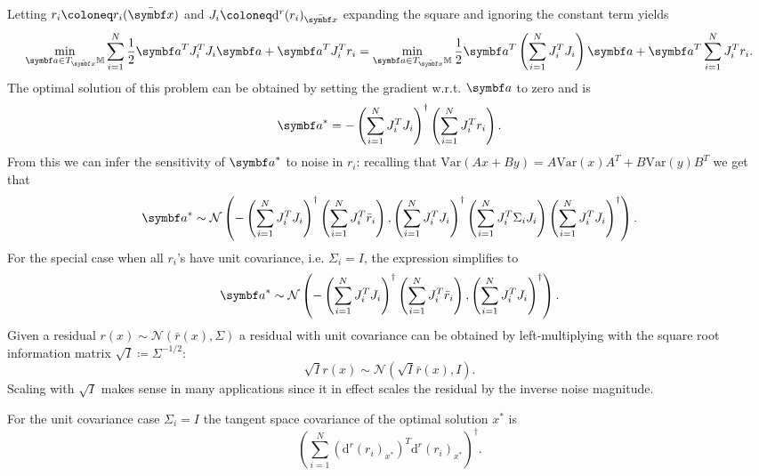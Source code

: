 Letting $r_{i} \coloneq r_{i}(\bar \x)$ and $J_{i} \coloneq \mathrm{d}^{r} (r_{i})_{\bar \x}$ expanding the square and ignoring the constant term yields
\begin{equation}
  \min_{\a \in T_{\bar \x} \M} \sum_{i=1}^{N}\frac{1}{2} \a^{T} J_{i}^{T} J_{i} \a + \a^{T} J_{i}^{T} r_{i} = \min_{\a \in T_{\bar \x} \M} \frac{1}{2} \a^{T} \left( \sum_{i=1}^{N} J_{i}^{T} J_{i} \right) \a + \a^{T} \sum_{i=1}^{N} J_{i}^{T} r_{i}.
\end{equation}
The optimal solution of this problem can be obtained by setting the gradient w.r.t. $\a$ to zero and is
\begin{equation}
  \a^{*} = -  \left( \sum_{i=1}^{N} J_{i}^{T} J_{i} \right)^{\dagger} \left( \sum_{i=1}^{N} J_{i}^{T} r_{i} \right).
\end{equation}
From this we can infer the sensitivity of $\a^{*}$ to noise in $r_{i}$: recalling that $\mathrm{Var}(A x + B y) = A \mathrm{Var}(x) A^{T} + B \mathrm{Var}(y) B^{T}$ we get that
\begin{equation}
  \a^{*} \sim \mathcal N \left( - \left( \sum_{i=1}^{N} J_{i}^{T} J_{i} \right)^{\dagger} \left( \sum_{i=1}^{N} J_{i}^{T} \bar r_{i} \right), \left( \sum_{i=1}^{N} J_{i}^{T} J_{i} \right)^{\dagger} \left( \sum_{i=1}^{N} J_{i}^{T} \Sigma_{i} J_{i} \right) \left( \sum_{i=1}^{N} J_{i}^{T} J_{i} \right)^{\dagger} \right).
\end{equation}
For the special case when all $r_{i}$'s have unit covariance, i.e. $\Sigma_{i} = I$, the expression simplifies to
\begin{equation}
  \a^{*} \sim \mathcal N \left( - \left( \sum_{i=1}^{N} J_{i}^{T} J_{i} \right)^{\dagger} \left( \sum_{i=1}^{N} J_{i}^{T} \bar r_{i} \right), \left( \sum_{i=1}^{N} J_{i}^{T} J_{i} \right)^{\dagger} \right).
\end{equation}
Given a residual $r(x) \sim \mathcal N(\bar r(x), \Sigma)$ a residual with unit covariance can be obtained by left-multiplying with the square root information matrix $\sqrt{I} \coloneq \Sigma^{-1/2}$:
\begin{equation}
  \label{eq:9}
  \sqrt{I} r(x) \sim \mathcal N\left(\sqrt{I} \bar r(x), I\right). \end{equation}
Scaling with $\sqrt{I}$ makes sense in many applications since it in effect scales the residual by the inverse noise magnitude.

\begin{important}
  For the unit covariance case $\Sigma_{i} = I$ the tangent space covariance of the optimal solution $x^{*}$ is
  \begin{equation}
    \left( \sum_{i=1}^{N} \left(\mathrm{d}^{r} (r_{i})_{x^{*}}\right)^{T} \mathrm{d}^{r} (r_{i})_{x^{*}} \right)^{\dagger}.
  \end{equation}
\end{important}


